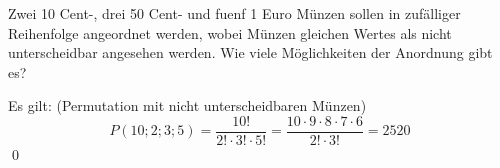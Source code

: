 \documentclass{abgabe}
\begin{document}
\begin{questions}
    \question
    Zwei 10 Cent-, drei 50 Cent- und fuenf 1 Euro Münzen sollen in zufälliger Reihenfolge angeordnet werden, wobei Münzen gleichen Wertes als nicht unterscheidbar angesehen werden. 
    Wie viele Möglichkeiten der Anordnung gibt es?
    \begin{solution}
        Es gilt:  (Permutation mit nicht unterscheidbaren Münzen)
        \[
            P(10;2;3;5) = \frac{10!}{2! \cdot 3! \cdot 5!} = \frac{10 \cdot 9 \cdot 8 \cdot 7 \cdot 6}{2! \cdot 3!} = \num{2520}    
        \]\qed
    \end{solution}
\end{questions}
\end{document}
